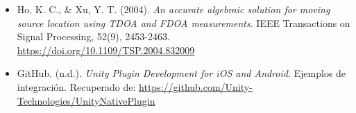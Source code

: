 \documentclass{article}
\begin{document}
\begin{itemize}
    \item Ho, K. C., \& Xu, Y. T. (2004). \textit{An accurate algebraic solution for moving source location using TDOA and FDOA measurements}. IEEE Transactions on Signal Processing, 52(9), 2453-2463. \url{https://doi.org/10.1109/TSP.2004.832009}
    
    \item GitHub. (n.d.). \textit{Unity Plugin Development for iOS and Android}. Ejemplos de integración. Recuperado de: \url{https://github.com/Unity-Technologies/UnityNativePlugin}
\end{itemize}
\end{document}
